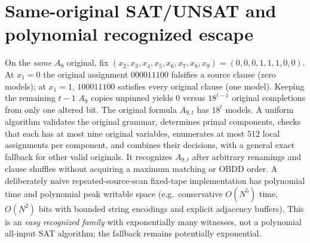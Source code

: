 \documentclass[11pt]{article}
\begin{document}
\section{Same-original SAT/UNSAT and polynomial recognized escape}
On the \emph{same} $A_9$ original, fix
$(x_2,x_3,x_4,x_5,x_6,x_7,x_8,x_9)=(0,0,0,1,1,1,0,0)$.
At $x_1=0$ the original assignment $000011100$ falsifies a source clause (zero models); at $x_1=1$, $100011100$ satisfies every original clause (one model). Keeping the remaining $t-1$ $A_9$ copies unpinned yields $0$ versus $18^{t-1}$ original completions from only one altered bit. The original formula $A_{9,t}$ has $18^t$ models.
A uniform algorithm validates the original grammar, determines primal components, checks that each has at most nine original variables, enumerates at most $512$ local assignments per component, and combines their decisions, with a general exact fallback for other valid originals. It recognizes $A_{9,t}$ after arbitrary renamings and clause shuffles without acquiring a maximum matching or OBDD order. A deliberately naive repeated-source-scan fixed-tape implementation has polynomial time and polynomial peak writable space (e.g.\ conservative $O(N^5)$ time, $O(N^2)$ bits with bounded string encodings and explicit adjacency buffers). This is an \emph{easy recognized family} with exponentially many witnesses, not a polynomial all-input SAT algorithm; the fallback remains potentially exponential.
\end{document}
